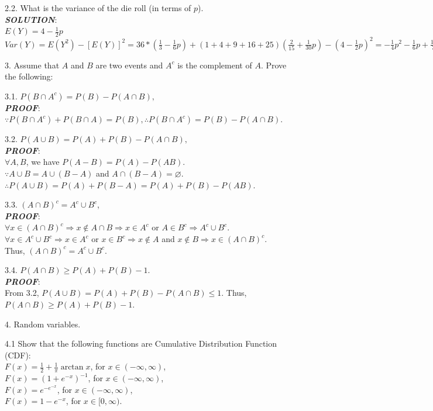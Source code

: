 \documentclass{article}
\theoremstyle{definition}
\theoremstyle{definition}
\theoremstyle{remark}
\begin{document}
2.2. What is the variance of the die roll (in terms of $p$).\\
\emph{\textbf{SOLUTION}}:\\
$E(Y) = 4-\frac{1}{2}p$\\
$Var(Y) = E(Y^2)-[E(Y)]^2 = 36*(\frac{1}{3}-\frac{1}{6}p)+(1+4+9+16+25)(\frac{2}{15}+\frac{1}{30}p)-(4-\frac{1}{2}p)^2
=-\frac{1}{4}p^2-\frac{1}{6}p+\frac{10}{3}$

3. Assume that $A$ and $B$ are two events and $A^c$ is the complement of $A$. Prove the following:

3.1. $P(B\cap A^c)=P(B)-P(A\cap B),$\\
\emph{\textbf{PROOF}}:\\
$\because P(B\cap A^c)+P(B\cap A) = P(B), \therefore P(B\cap A^c)=P(B)-P(A\cap B).$

3.2. $P(A\cup B) = P(A)+P(B)-P(A\cap B),$\\
\emph{\textbf{PROOF}}:\\
$\forall A, B$, we have $P(A-B) = P(A)-P(AB)$.\\
$\because A\cup B = A \cup (B-A)$ and $A\cap(B-A)=\varnothing$. \\
$\therefore P(A\cup B)=P(A)+P(B-A)=P(A)+P(B)-P(AB)$.

3.3. $(A\cap B)^c = A^c\cup B^c$,\\
\emph{\textbf{PROOF}}:\\
$\forall x \in (A\cap B)^c \Rightarrow x \not\in A\cap B \Rightarrow x\in A^c$ or $A\in B^c\Rightarrow A^c\cup B^c$.\\
$\forall x \in A^c\cup B^c \Rightarrow x \in A^c$ or $x \in B^c\Rightarrow x\not\in A$ and $x \not\in B\Rightarrow x \in (A\cap B)^c $.\\
Thus, $(A\cap B)^c = A^c\cup B^c$.

3.4. $P(A\cap B)\geq P(A)+P(B)-1$.\\
\emph{\textbf{PROOF}}:\\
From 3.2, $P(A\cup B) = P(A)+P(B)-P(A\cap B) \leq 1$. Thus, $P(A\cap B)\geq P(A)+P(B)-1$.

4. Random variables.

4.1 Show that the following functions are Cumulative Distribution Function (CDF):\\
$F(x)=\frac 1 2 + \frac 1 \pi \arctan x$, for $x\in(-\infty,\infty)$,\\
$F(x)=(1+e^{-x})^{-1}$, for $x\in(-\infty,\infty)$,\\
$F(x)=e^{-e^{-x}}$, for $x\in(-\infty,\infty)$,\\
$F(x)=1-e^{-x}$, for $x\in[0,\infty)$.
\end{document}
